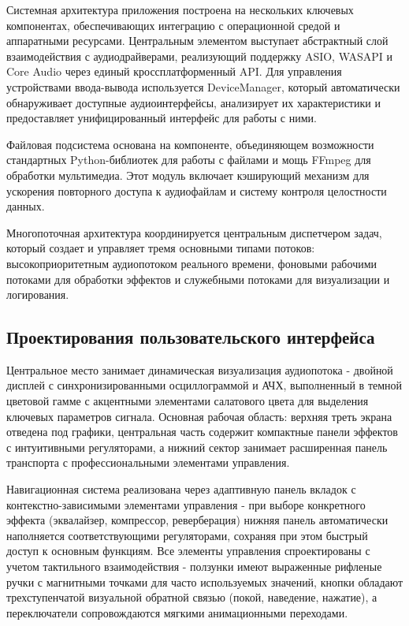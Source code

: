 Системная архитектура приложения построена на нескольких ключевых компонентах, обеспечивающих интеграцию с операционной средой и аппаратными ресурсами. Центральным элементом выступает абстрактный слой взаимодействия с аудиодрайверами, реализующий поддержку ASIO, WASAPI и Core Audio через единый кроссплатформенный API. Для управления устройствами ввода-вывода используется DeviceManager, который автоматически обнаруживает доступные аудиоинтерфейсы, анализирует их характеристики и предоставляет унифицированный интерфейс для работы с ними.

Файловая подсистема основана на компоненте, объединяющем возможности стандартных Python-библиотек для работы с файлами и мощь FFmpeg для обработки мультимедиа. Этот модуль включает кэширующий механизм для ускорения повторного доступа к аудиофайлам и систему контроля целостности данных. 

Многопоточная архитектура координируется центральным диспетчером задач, который создает и управляет тремя основными типами потоков: высокоприоритетным аудиопотоком реального времени, фоновыми рабочими потоками для обработки эффектов и служебными потоками для визуализации и логирования.

\subsection{Проектирования пользовательского интерфейса}

Центральное место занимает динамическая визуализация аудиопотока - двойной дисплей с синхронизированными осциллограммой и АЧХ, выполненный в темной цветовой гамме с акцентными элементами салатового цвета для выделения ключевых параметров сигнала. Основная рабочая область: верхняя треть экрана отведена под графики, центральная часть содержит компактные панели эффектов с интуитивными регуляторами, а нижний сектор занимает расширенная панель транспорта с профессиональными элементами управления.

Навигационная система реализована через адаптивную панель вкладок с контекстно-зависимыми элементами управления - при выборе конкретного эффекта (эквалайзер, компрессор, реверберация) нижняя панель автоматически наполняется соответствующими регуляторами, сохраняя при этом быстрый доступ к основным функциям. Все элементы управления спроектированы с учетом тактильного взаимодействия - ползунки имеют выраженные рифленые ручки с магнитными точками для часто используемых значений, кнопки обладают трехступенчатой визуальной обратной связью (покой, наведение, нажатие), а переключатели сопровождаются мягкими анимационными переходами.

